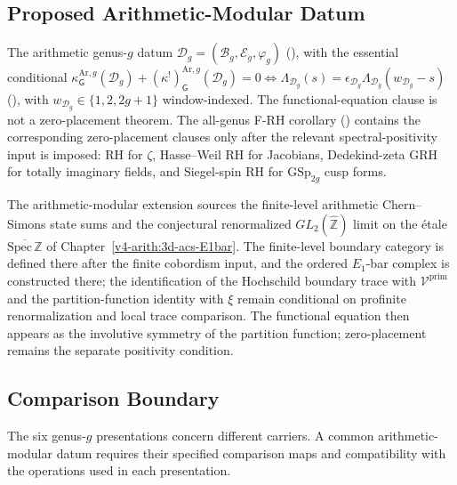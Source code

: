 \subsection{Proposed Arithmetic-Modular Datum}
\label{v4-arith:app:B:genus-g:converged}

The arithmetic genus-\(g\) datum \(\mathcal{D}_g=(\mathcal{B}_g,\mathcal{E}_g,\varphi_g)\)
(), with the essential conditional
\(\kappa^{\mathrm{Ar},g}_{\mathsf{G}}(\mathcal{D}_g)+(\kappa^{!})^{\mathrm{Ar},g}_{\mathsf{G}}(\mathcal{D}_g)=0\Leftrightarrow\Lambda_{\mathcal{D}_g}(s)=\epsilon_{\mathcal{D}_g}\Lambda_{\mathcal{D}_g}(w_{\mathcal{D}_g}-s)\)
(), with
\(w_{\mathcal{D}_g}\in\{1,2,2g+1\}\) window-indexed. The
functional-equation clause is not a zero-placement theorem. The
all-genus F-RH corollary
() contains the corresponding
zero-placement clauses only after the relevant spectral-positivity
input is imposed: RH for \(\zeta\), Hasse--Weil RH for Jacobians,
Dedekind-zeta GRH for totally imaginary fields, and Siegel-spin RH for
\(\mathrm{GSp}_{2g}\) cusp forms.

The arithmetic-modular extension sources the finite-level
arithmetic Chern--Simons state sums and the conjectural renormalized
$GL_{2}(\widehat{\mathbb{Z}})$ limit on the \'etale
$\overline{\mathrm{Spec}\,\mathbb{Z}}$ of
Chapter~\ref{v4-arith:3d-acs-E1bar}. The finite-level boundary
category is defined there after the finite cobordism input, and the
ordered $E_{1}$-bar complex is constructed there; the identification
of the Hochschild boundary trace with $\mathcal{V}^{\mathrm{prim}}$
and the partition-function identity with $\xi$ remain conditional on
profinite renormalization and local trace comparison. The functional
equation then appears as the involutive symmetry of the partition
function; zero-placement remains the separate positivity condition.

\subsection{Comparison Boundary}
\label{v4-arith:app:B:genus-g:criterion}

The six genus-\(g\) presentations concern different carriers. A common
arithmetic-modular datum requires their specified comparison maps and
compatibility with the operations used in each presentation.
